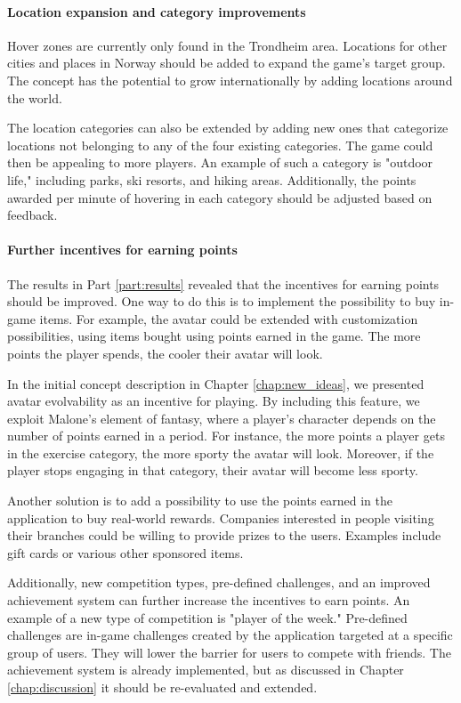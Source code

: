 \paragraph*{Location expansion and category improvements}
Hover zones are currently only found in the Trondheim area. Locations for other cities and places in Norway should be added to expand the game’s target group. The concept has the potential to grow internationally by adding locations around the world. 

The location categories can also be extended by adding new ones that categorize locations not belonging to any of the four existing categories. The game could then be appealing to more players. An example of such a category is "outdoor life," including parks, ski resorts, and hiking areas. Additionally, the points awarded per minute of hovering in each category should be adjusted based on feedback.

\paragraph*{Further incentives for earning points}
The results in Part \ref{part:results} revealed that the incentives for earning points should be improved. One way to do this is to implement the possibility to buy in-game items. For example, the avatar could be extended with customization possibilities, using items bought using points earned in the game. The more points the player spends, the cooler their avatar will look. 

In the initial concept description in Chapter \ref{chap:new_ideas}, we presented avatar evolvability as an incentive for playing. By including this feature, we exploit Malone’s element of fantasy, where a player’s character depends on the number of points earned in a period. For instance, the more points a player gets in the exercise category, the more sporty the avatar will look. Moreover, if the player stops engaging in that category, their avatar will become less sporty.

Another solution is to add a possibility to use the points earned in the application to buy real-world rewards. Companies interested in people visiting their branches could be willing to provide prizes to the users. Examples include gift cards or various other sponsored items.

Additionally, new competition types, pre-defined challenges, and an improved achievement system can further increase the incentives to earn points. An example of a new type of competition is "player of the week." Pre-defined challenges are in-game challenges created by the application targeted at a specific group of users. They will lower the barrier for users to compete with friends. The achievement system is already implemented, but as discussed in Chapter \ref{chap:discussion} it should be re-evaluated and extended.

